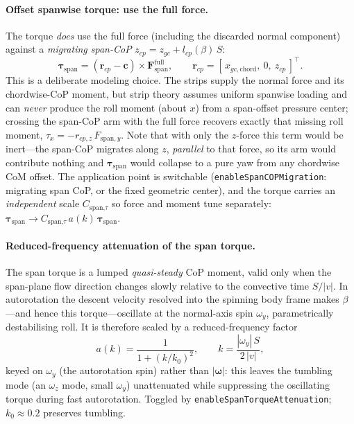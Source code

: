 \documentclass[11pt]{article}
\begin{document}
\paragraph{Offset spanwise torque: use the full force.} The torque \emph{does} use the
full force (including the discarded normal component) against a \emph{migrating span-CoP}
$z_{cp}=z_{gc}+l_{cp}(\beta)\,S$:
\[
  \boldsymbol\tau_{\text{span}} = (\mathbf r_{cp}-\mathbf c)\times\mathbf F_{\text{span}}^{\text{full}},
  \qquad \mathbf r_{cp}=[\,x_{gc,\text{chord}},\ 0,\ z_{cp}\,]^{\top}.
\]
This is a deliberate modeling choice. The strips supply the normal force and its
chordwise-CoP moment, but strip theory assumes uniform spanwise loading and can
\emph{never} produce the roll moment (about $x$) from a span-offset pressure center;
crossing the span-CoP arm with the full force recovers exactly that missing roll moment,
$\tau_x=-r_{cp,z}\,F_{\text{span},y}$. Note that with only the $z$-force this term would
be inert---the span-CoP migrates along $z$, \emph{parallel} to that force, so its arm
would contribute nothing and $\boldsymbol\tau_{\text{span}}$ would collapse to a pure yaw
from any chordwise CoM offset. The application point is switchable
(\texttt{enableSpanCOPMigration}: migrating span CoP, or the fixed geometric center), and
the torque carries an \emph{independent} scale $C_{\text{span,}\tau}$ so force and moment
tune separately: $\boldsymbol\tau_{\text{span}}\!\to\!C_{\text{span,}\tau}\,a(k)\,\boldsymbol\tau_{\text{span}}$.

\paragraph{Reduced-frequency attenuation of the span torque.} The span torque is a lumped
\emph{quasi-steady} CoP moment, valid only when the span-plane flow direction changes
slowly relative to the convective time $S/|v|$. In autorotation the descent velocity
resolved into the spinning body frame makes $\beta$---and hence this torque---oscillate at
the normal-axis spin $\omega_y$, parametrically destabilising roll. It is therefore scaled
by a reduced-frequency factor
\[
  a(k)=\frac{1}{1+(k/k_0)^2},\qquad k=\frac{|\omega_y|\,S}{2\,|v|},
\]
keyed on $\omega_y$ (the autorotation spin) rather than $|\boldsymbol\omega|$: this leaves
the tumbling mode (an $\omega_z$ mode, small $\omega_y$) unattenuated while suppressing the
oscillating torque during fast autorotation. Toggled by
\texttt{enableSpanTorqueAttenuation}; $k_0\approx0.2$ preserves tumbling.
\end{document}
